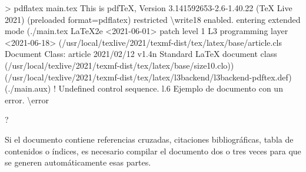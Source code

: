 \documentclass[
  letterpaper,
  DIV=11,
  numbers=noendperiod]{scrreport}
\newenvironment{Shaded}{\begin{snugshade}}{\end{snugshade}}
\newcommand{\DataTypeTok}[1]{\textcolor[rgb]{0.68,0.00,0.00}{#1}}
\newcommand{\ErrorTok}[1]{\textcolor[rgb]{0.68,0.00,0.00}{#1}}
\newcommand{\ExtensionTok}[1]{\textcolor[rgb]{0.00,0.23,0.31}{#1}}
\newcommand{\KeywordTok}[1]{\textcolor[rgb]{0.00,0.23,0.31}{#1}}
\newcommand{\NormalTok}[1]{\textcolor[rgb]{0.00,0.23,0.31}{#1}}
\newcommand{\OperatorTok}[1]{\textcolor[rgb]{0.37,0.37,0.37}{#1}}
\newcommand{\OtherTok}[1]{\textcolor[rgb]{0.00,0.23,0.31}{#1}}
\begin{document}
\begin{Shaded}
\begin{Highlighting}[]
\OperatorTok{\textgreater{}}\NormalTok{ pdflatex }\ExtensionTok{main.tex}
\ExtensionTok{This}\NormalTok{ is pdfTeX, Version 3.141592653{-}2.6{-}1.40.22 }\ErrorTok{(}\ExtensionTok{TeX}\NormalTok{ Live 2021}\KeywordTok{)} \KeywordTok{(}\ExtensionTok{preloaded}\NormalTok{ format=pdflatex}\KeywordTok{)}
 \ExtensionTok{restricted} \DataTypeTok{\textbackslash{}w}\NormalTok{rite18 enabled.}
\ExtensionTok{entering}\NormalTok{ extended mode}
\KeywordTok{(}\ExtensionTok{./main.tex}
\ExtensionTok{LaTeX2e} \OperatorTok{\textless{}}\NormalTok{2021{-}06{-}01}\OperatorTok{\textgreater{}}\NormalTok{ patch level 1}
\ExtensionTok{L3}\NormalTok{ programming layer }\OperatorTok{\textless{}}\NormalTok{2021{-}06{-}18}\OperatorTok{\textgreater{}}
\KeywordTok{(}\ExtensionTok{/usr/local/texlive/2021/texmf{-}dist/tex/latex/base/article.cls}
\ExtensionTok{Document}\NormalTok{ Class: article 2021/02/12 v1.4n Standard LaTeX document class}
\KeywordTok{(}\ExtensionTok{/usr/local/texlive/2021/texmf{-}dist/tex/latex/base/size10.clo}\KeywordTok{))}
\KeywordTok{(}\ExtensionTok{/usr/local/texlive/2021/texmf{-}dist/tex/latex/l3backend/l3backend{-}pdftex.def}\KeywordTok{)}
\KeywordTok{(}\ExtensionTok{./main.aux}\KeywordTok{)}
\OtherTok{! }\ExtensionTok{Undefined}\NormalTok{ control sequence.}
\ExtensionTok{l.6}\NormalTok{ Ejemplo de documento con un error. }\DataTypeTok{\textbackslash{}e}\NormalTok{rror}
                                             
\ExtensionTok{?} 
\end{Highlighting}
\end{Shaded}

\begin{tcolorbox}[enhanced jigsaw, colback=white, colframe=quarto-callout-warning-color-frame, title=\textcolor{quarto-callout-warning-color}{\faExclamationTriangle}\hspace{0.5em}{Advertencia}, bottomtitle=1mm, colbacktitle=quarto-callout-warning-color!10!white, bottomrule=.15mm, titlerule=0mm, opacityback=0, toptitle=1mm, arc=.35mm, left=2mm, rightrule=.15mm, toprule=.15mm, coltitle=black, leftrule=.75mm, opacitybacktitle=0.6, breakable]
Si el documento contiene referencias cruzadas, citaciones
bibliográficas, tabla de contenidos o índices, es necesario compilar el
documento dos o tres veces para que se generen automáticamente esas
partes.
\end{tcolorbox}

\end{document}
